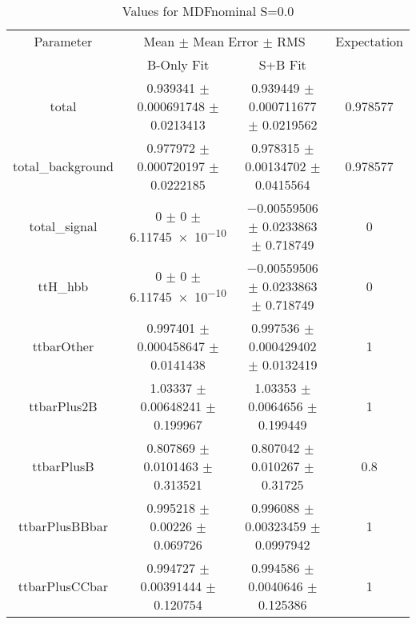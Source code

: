 \begin{table}
\centering
\caption{Values for MDFnominal S=0.0}
\begin{tabular}{cccc}
\toprule
Parameter & \multicolumn{2}{c}{Mean $\pm$ Mean Error $\pm$ RMS} & Expectation\\
 & B-Only Fit & S+B Fit & \\
\midrule
total & \num{0.939341} $\pm$ \num{0.000691748} $\pm$ \num{0.0213413} & \num{0.939449} $\pm$ \num{0.000711677} $\pm$ \num{0.0219562} & \num{0.978577}\\
total\_background & \num{0.977972} $\pm$ \num{0.000720197} $\pm$ \num{0.0222185} & \num{0.978315} $\pm$ \num{0.00134702} $\pm$ \num{0.0415564} & \num{0.978577}\\
total\_signal & \num{0} $\pm$ \num{0} $\pm$ \num{6.11745e-10} & \num{-0.00559506} $\pm$ \num{0.0233863} $\pm$ \num{0.718749} & \num{0}\\
ttH\_hbb & \num{0} $\pm$ \num{0} $\pm$ \num{6.11745e-10} & \num{-0.00559506} $\pm$ \num{0.0233863} $\pm$ \num{0.718749} & \num{0}\\
ttbarOther & \num{0.997401} $\pm$ \num{0.000458647} $\pm$ \num{0.0141438} & \num{0.997536} $\pm$ \num{0.000429402} $\pm$ \num{0.0132419} & \num{1}\\
ttbarPlus2B & \num{1.03337} $\pm$ \num{0.00648241} $\pm$ \num{0.199967} & \num{1.03353} $\pm$ \num{0.0064656} $\pm$ \num{0.199449} & \num{1}\\
ttbarPlusB & \num{0.807869} $\pm$ \num{0.0101463} $\pm$ \num{0.313521} & \num{0.807042} $\pm$ \num{0.010267} $\pm$ \num{0.31725} & \num{0.8}\\
ttbarPlusBBbar & \num{0.995218} $\pm$ \num{0.00226} $\pm$ \num{0.069726} & \num{0.996088} $\pm$ \num{0.00323459} $\pm$ \num{0.0997942} & \num{1}\\
ttbarPlusCCbar & \num{0.994727} $\pm$ \num{0.00391444} $\pm$ \num{0.120754} & \num{0.994586} $\pm$ \num{0.0040646} $\pm$ \num{0.125386} & \num{1}\\
\bottomrule
\end{tabular}
\end{table}